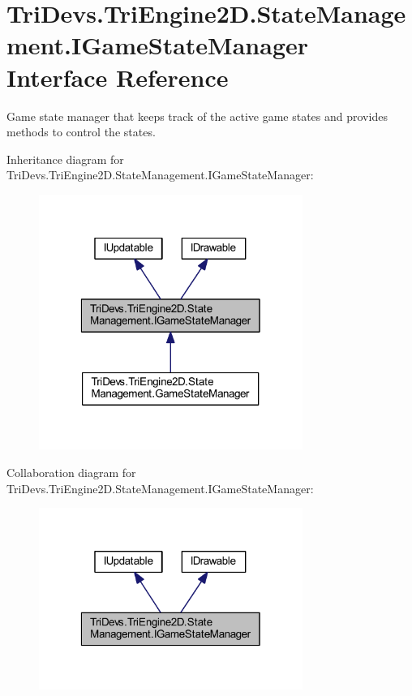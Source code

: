 \hypertarget{interface_tri_devs_1_1_tri_engine2_d_1_1_state_management_1_1_i_game_state_manager}{\section{Tri\-Devs.\-Tri\-Engine2\-D.\-State\-Management.\-I\-Game\-State\-Manager Interface Reference}
\label{interface_tri_devs_1_1_tri_engine2_d_1_1_state_management_1_1_i_game_state_manager}
}


Game state manager that keeps track of the active game states and provides methods to control the states.  




Inheritance diagram for Tri\-Devs.\-Tri\-Engine2\-D.\-State\-Management.\-I\-Game\-State\-Manager\-:
\nopagebreak
\begin{figure}[H]
\begin{center}
\leavevmode
\includegraphics[width=244pt]{interface_tri_devs_1_1_tri_engine2_d_1_1_state_management_1_1_i_game_state_manager__inherit__graph}
\end{center}
\end{figure}


Collaboration diagram for Tri\-Devs.\-Tri\-Engine2\-D.\-State\-Management.\-I\-Game\-State\-Manager\-:
\nopagebreak
\begin{figure}[H]
\begin{center}
\leavevmode
\includegraphics[width=244pt]{interface_tri_devs_1_1_tri_engine2_d_1_1_state_management_1_1_i_game_state_manager__coll__graph}
\end{center}
\end{figure}
